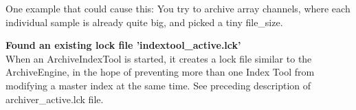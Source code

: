 One example that could cause this: You try to archive array channels,
where each individual sample is already quite big, and picked a tiny
file\_size. 

\noindent
\textbf{Found an existing lock file 'indextool\_active.lck'}\\
When an ArchiveIndexTool is started, it creates a lock file
similar to the ArchiveEngine, in the hope of preventing more than
one Index Tool from modifying a master index at the same time.
See preceding description of archiver\_active.lck file.

